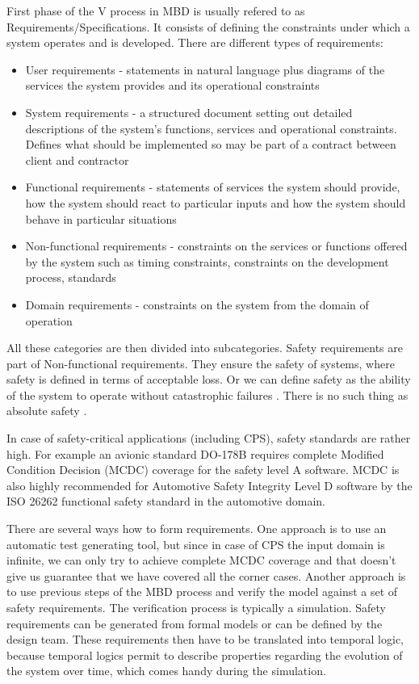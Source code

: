 First phase of the V process in MBD is usually refered to as Requirements/Specifications. It consists of defining the constraints under which a system operates and is developed. There are different types of requirements:

\begin{itemize}
	\item User requirements - statements in natural language plus diagrams of the services the system provides and its operational constraints
	\item System requirements - a structured document setting out detailed descriptions of the system’s functions, services and operational constraints. Defines what should be implemented so may be part of a contract between client and contractor
	\item Functional requirements - statements of services the system should provide, how the system should react to particular inputs and how the system should behave in particular situations
	\item Non-functional requirements - constraints on the services or functions offered by the system such as timing constraints, constraints on the development process, standards
	\item Domain requirements - constraints on the system from the domain of operation
\end{itemize}

All these categories are then divided into subcategories. Safety requirements are part of Non-functional requirements. They ensure the safety of systems, where safety is defined in terms of acceptable loss. Or we can define safety as the ability of the system to operate without catastrophic failures \cite{Sommerville:SoftwareEngineering}. There is no such thing as absolute safety \cite{Leveson:SystemSafety}.

In case of safety-critical applications (including CPS), safety standards are rather high. For example an avionic standard DO-178B \cite{Maxey:AvionicStandardDO178B} requires complete Modified Condition Decision (MCDC) \cite{Chilenski:MCDC} coverage for the safety level A software. MCDC is also highly recommended for Automotive Safety Integrity Level D software by the ISO 26262 functional safety standard \cite{ISO26262} in the automotive domain.

There are several ways how to form requirements. One approach is to use an automatic test generating tool, but since in case of CPS the input domain is infinite, we can only try to achieve complete MCDC coverage and that doesn't give us guarantee that we have covered all the corner cases. Another approach is to use previous steps of the MBD process and verify the model against a set of safety requirements. The verification process is typically a simulation. Safety requirements can be generated from formal models or can be defined by the design team. These requirements then have to be translated into temporal logic, because temporal logics permit to describe properties regarding the evolution of the system over time, which comes handy during the simulation.

